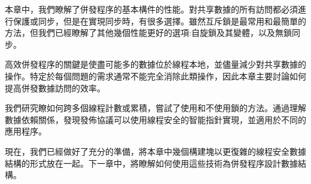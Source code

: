 本章中，我們瞭解了併發程序的基本構件的性能。對共享數據的所有訪問都必須進行保護或同步，但是在實現同步時，有很多選擇。雖然互斥鎖是最常用和最簡單的方法，但我們已經瞭解了其他幾個性能更好的選項:自旋鎖及其變體，以及無鎖同步。

高效併發程序的關鍵是使盡可能多的數據位於線程本地，並儘量減少對共享數據的操作。特定於每個問題的需求通常不能完全消除此類操作，因此本章主要討論如何提高併發數據訪問的效率。

我們研究瞭如何跨多個線程計數或累積，嘗試了使用和不使用鎖的方法。通過理解數據依賴關係，發現發佈協議可以使用線程安全的智能指針實現，並適用於不同的應用程序。

現在，我們已經做好了充分的準備，將本章中幾個構建塊以更復雜的線程安全數據結構的形式放在一起。下一章中，將瞭解如何使用這些技術為併發程序設計數據結構。